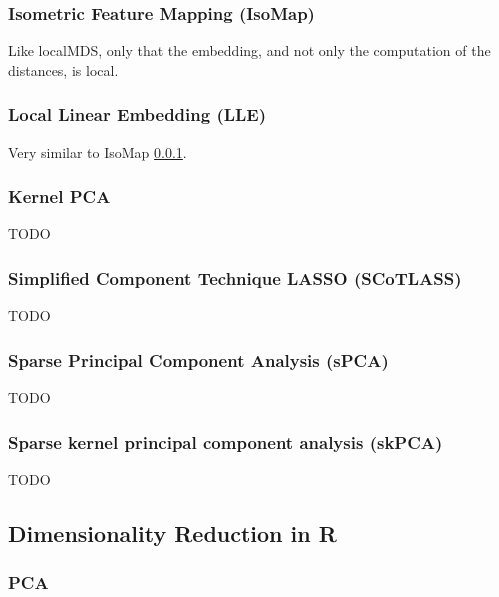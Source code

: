 \documentclass[]{book}
\theoremstyle{definition}
\theoremstyle{definition}
\theoremstyle{definition}
\theoremstyle{remark}
\begin{document}
\subsubsection{Isometric Feature Mapping (IsoMap)}\label{isomap}

Like localMDS, only that the embedding, and not only the computation of
the distances, is local.

\subsubsection{Local Linear Embedding
(LLE)}\label{local-linear-embedding-lle}

Very similar to IsoMap \ref{isomap}.

\subsubsection{Kernel PCA}\label{kernel-pca}

TODO

\subsubsection{Simplified Component Technique LASSO
(SCoTLASS)}\label{simplified-component-technique-lasso-scotlass}

TODO

\subsubsection{Sparse Principal Component Analysis
(sPCA)}\label{sparse-principal-component-analysis-spca}

TODO

\subsubsection{Sparse kernel principal component analysis
(skPCA)}\label{sparse-kernel-principal-component-analysis-skpca}

TODO

\subsection{Dimensionality Reduction in
R}\label{dimensionality-reduction-in-r}

\subsubsection{PCA}\label{pca-in-r}
\end{document}
